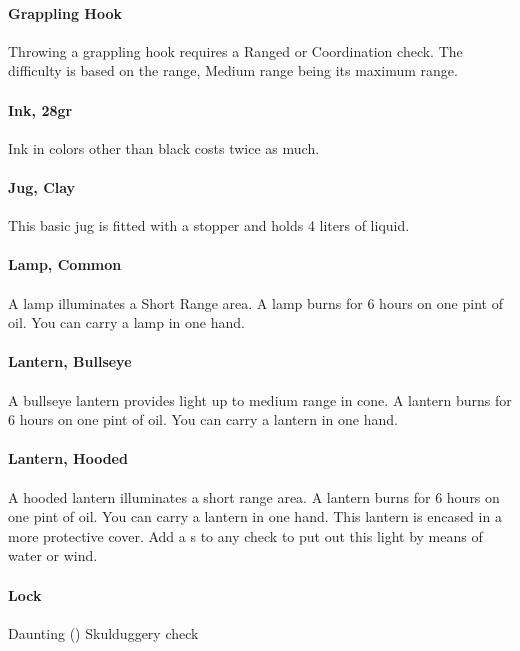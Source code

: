 \begin{multicols}{2}
\paragraph{Grappling Hook} \label{advitm:grapplinghook}
Throwing a grappling hook requires a
Ranged or Coordination check. The difficulty is based on
the range, Medium range being its maximum range.

\paragraph{Ink, 28gr} \label{advitm:ink}
Ink in colors other than black costs twice as much.

\paragraph{Jug, Clay} \label{advitm:jug}
This basic jug is fitted with a stopper and holds 4 liters of liquid.

\paragraph{Lamp, Common} \label{advitm:lamp_common}
A lamp illuminates a Short Range area. A lamp burns
for 6 hours on one pint of oil. You can carry a lamp in
one hand.

\paragraph{Lantern, Bullseye} \label{advitm:lantern_bullseye}
A bullseye lantern provides light up to medium range in
cone. A lantern burns for 6 hours on one pint of oil. You
can carry a lantern in one hand.

\paragraph{Lantern, Hooded} \label{advitm:lantern_hooded}
A hooded lantern illuminates a short range area. A
lantern burns for 6 hours on one pint of oil. You can
carry a lantern in one hand.
This lantern is encased in a more protective cover.
Add a s to any check to put out this light by means of
water or wind.

\paragraph{Lock} \label{advitm:lock}
Daunting (\difficulty\difficulty\difficulty\difficulty) Skulduggery check


\end{multicols}
